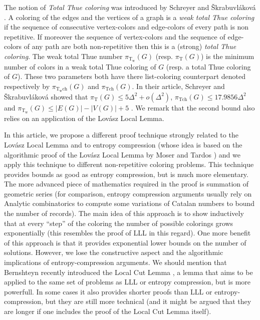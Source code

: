 \documentclass[a4paper,10pt]{article}
\begin{document}
The notion of \emph{Total Thue coloring} was introduced by
Schreyer and  \v{S}krabuvl\'akov\'a \cite{introthuetotalcol}.
A coloring of the edges and the vertices of a graph is a \emph{weak total Thue coloring} if the sequence of consecutive vertex-colors and edge-colors of every path is non repetitive. If moreover the sequence of vertex-colors and the sequence of edge-colors of any path are both non-repetitive then this is a (strong) \emph{total Thue coloring}.
The weak total Thue number $\pi_{\operatorname{T_w}}(G)$ (resp. $\pi_{\operatorname{T}}(G)$) is the minimum number of colors in a weak total Thue coloring  of $G$ (resp. a total Thue coloring of $G$). These two parameters both have there list-coloring counterpart denoted respectively by  $\pi_{\operatorname{T_wch}}(G)$ and $\pi_{\operatorname{Tch}}(G)$.
In their article, Schreyer and  \v{S}krabuvl\'akov\'a showed that
$\pi_{\operatorname{T}}(G)\le 5\Delta^2+o(\Delta^2)$, 
$\pi_{\operatorname{Tch}}(G)\le 17.9856\Delta^2$ and 
$\pi_{\operatorname{T_w}}(G)\le |E(G)|-|V(G)|+5$ \cite{introthuetotalcol}.
We remark that the second bound also relies on an application of the Lov\'asz Local Lemma.

In this article, we propose a different proof technique strongly related to the Lov\'asz Local Lemma and to entropy compression (whose idea is based on the algorithmic proof of the Lov\'asz Local Lemma by Moser and Tardos \cite{10.1145/1667053.1667060})  and we apply this technique to different non-repetitive coloring problems.
This technique provides bounds as good as entropy compression, but is much more elementary. 
The more advanced piece of mathematics required in the proof is summation of geometric series (for comparison, entropy compression arguments usually rely on Analytic combinatorics to compute some variations of Catalan numbers to bound the number of records). 
The main idea of this approach is to show inductively that at every ``step'' of the coloring the number of possible colorings grows exponentially (this resembles the proof of LLL in this regard).
One more benefit of this approach is that it provides exponential lower bounds on the number of solutions. However, we lose the constructive aspect and the algorithmic implications of entropy-compression arguments.
We should mention that Bernshteyn recently introduced the Local Cut Lemma \cite{BERNSHTEYN201795}, a lemma that aims to be applied to the same set of problems as LLL or entropy compression, but is more powerfull.
In some cases it also provides shorter proofs than LLL or entropy-compression, but they are still more technical (and it might be argued that they are longer if one includes the proof of the Local Cut Lemma itself).
\end{document}
